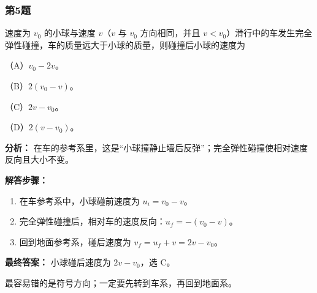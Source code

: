 \documentclass[12pt,a4paper]{ctexart}
\begin{document}
\subsubsection*{第5题}
\begin{tcolorbox}[colback=gray!2!white,colframe=black!60,title={题目}]
速度为 \(v_0\) 的小球与速度 \(v\)（\(v\) 与 \(v_0\) 方向相同，并且 \(v<v_0\)）滑行中的车发生完全弹性碰撞，车的质量远大于小球的质量，则碰撞后小球的速度为\par
（A）\(v_0-2v\)。\par
（B）\(2(v_0-v)\)。\par
（C）\(2v-v_0\)。\par
（D）\(2(v-v_0)\)。\par
\end{tcolorbox}
\begin{tcolorbox}[colback=blue!2!white,colframe=blue!55!black,title={完整答案}]
\textbf{分析：}
在车的参考系里，这是“小球撞静止墙后反弹”；完全弹性碰撞使相对速度反向且大小不变。\par
\textbf{解答步骤：}
\begin{enumerate}
\item 在车参考系中，小球碰前速度为 \(u_i=v_0-v\)。
\item 完全弹性碰撞后，相对车的速度反向：\(u_f=-(v_0-v)\)。
\item 回到地面参考系，碰后速度为 \(v_f=u_f+v=2v-v_0\)。
\end{enumerate}
\textbf{最终答案：}
小球碰后速度为 \(2v-v_0\)，选 C。\par
\end{tcolorbox}
\begin{tcolorbox}[colback=red!2!white,colframe=red!55!black,title={易错点}]
最容易错的是符号方向；一定要先转到车系，再回到地面系。\par
\end{tcolorbox}
\end{document}
